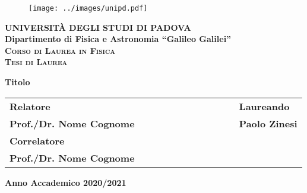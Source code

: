 \frontmatter
\begin{titlepage}
\begin{figure}[hbtp]
\centering
\texttt{[image: ../images/unipd.pdf]}
\end{figure}
\vspace{5mm}
\begin{center}
{{\huge{\textsc{\bf UNIVERSIT\`A DEGLI STUDI DI PADOVA}}}\\}
\vspace{5mm}
{\Large{\bf Dipartimento di Fisica e Astronomia ``Galileo Galilei''}} \\
\vspace{5mm}
{\Large{\textsc{\bf Corso di Laurea in Fisica}}}\\
\vspace{20mm}
{\Large{\textsc{\bf Tesi di Laurea}}}\\
\vspace{30mm}
\begin{spacing}{3}
{\LARGE \textbf{Titolo}}\\
\end{spacing}
\vspace{8mm}
\end{center}

\vspace{10mm}
\begin{spacing}{2}
\begin{tabular}{ l  c  c c c  cc c c c c  l }
{\Large{\bf Relatore}} &&&&&&&&&&& {\Large{\bf Laureando}}\\
{\Large{\bf Prof./Dr. Nome Cognome}} &&&&&&&&&&& {\Large{\bf Paolo Zinesi}}\\
{\Large{\bf Correlatore}}\\
{\Large{\bf Prof./Dr. Nome Cognome}}\\
\end{tabular}
\end{spacing}
\vspace{10mm}

\begin{center}
{\Large{\bf Anno Accademico 2020/2021}}
\end{center}
\end{titlepage}